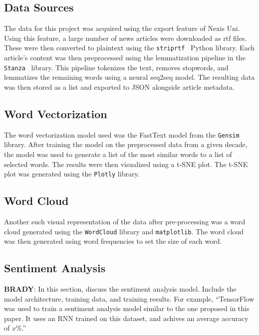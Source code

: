 \documentclass[11pt,a4paper, twocolumn]{article}
\begin{document}
\subsection{Data Sources}

The data for this project was acquired using the export feature of Nexis Uni. Using this feature, a large number of news articles were downloaded as rtf files. These were then converted to plaintext using the \texttt{striprtf}~\citep{striprtf} Python library. Each article's content was then preprocessed using the lemmatization pipeline in the \texttt{Stanza}~\citep{stanza} library. This pipeline tokenizes the text, removes stopwords, and lemmatizes the remaining words using a neural seq2seq model. The resulting data was then stored as a list and exported to JSON alongside article metadata.

\subsection{Word Vectorization}

The word vectorization model used was the FastText model from the \texttt{Gensim} library. After training the model on the preprocessed data from a given decade, the model was used to generate a list of the most similar words to a list of selected words. The results were then visualized using a t-SNE plot. The t-SNE plot was generated using the \texttt{Plotly} library.

\subsection{Word Cloud}

Another such visual representation of the data after pre-processing was a word cloud generated using the \texttt{WordCloud} library and \texttt{matplotlib}. The word cloud was then generated using word frequencies to set the size of each word.

\subsection{Sentiment Analysis}
\textbf{BRADY}: In this section, discuss the sentiment analysis model. Include the model architecture, training data, and training results. For example, ``TensorFlow was used to train a sentiment analysis model similar to the one proposed in this paper. It uses an RNN trained on this dataset, and achives an average accuracy of $x$\%.''
\end{document}
